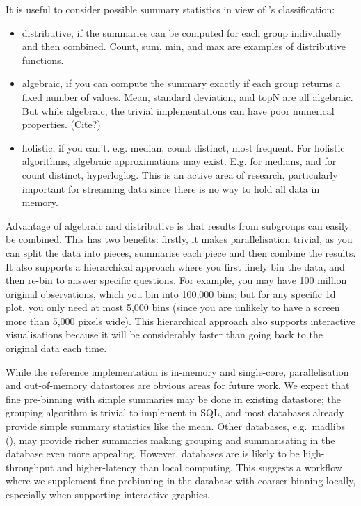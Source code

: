 \documentclass[journal]{vgtc}                %
\begin{document}
It is useful to consider possible summary statistics in view of \citep{gray:1997}'s classification:

\begin{itemize}
  \item distributive, if the summaries can be computed for each group individually and then combined. Count, sum, min, and max are examples of distributive functions.
  
  \item algebraic, if you can compute the summary exactly if each group returns a fixed number of values. Mean, standard deviation, and topN are all algebraic. But while algebraic, the trivial implementations can have poor numerical properties. (Cite?)
  
  \item holistic, if you can't. e.g. median, count distinct, most frequent. For holistic algorithms, algebraic approximations may exist. E.g. for medians, and for count distinct, hyperloglog.  This is an active area of research, particularly important for streaming data since there is no way to hold all data in memory.

\end{itemize}

Advantage of algebraic and distributive is that results from subgroups can easily be combined. This has two benefits: firstly, it makes parallelisation trivial, as you can split the data into pieces, summarise each piece and then combine the results. It also supports a hierarchical approach where you first finely bin the data, and then re-bin to answer specific questions. For example, you may have 100 million original observations, which you bin into 100,000 bins; but for any specific 1d plot, you only need at most 5,000 bins (since you are unlikely to have a screen more than 5,000 pixels wide). This hierarchical approach also supports interactive visualisations because it will be considerably faster than going back to the original data each time.

While the reference implementation is in-memory and single-core, parallelisation and out-of-memory datastores are obvious areas for  future work. We expect that fine pre-binning with simple summaries may be done in existing datastore; the grouping algorithm is trivial to implement in SQL, and most databases already provide simple summary statistics like the mean. Other databases, e.g.\ madlibs (), may provide richer summaries making grouping and summarisating in the database even more appealing. However, databases are is likely to be high-throughput and higher-latency than local computing. This suggests a workflow where we supplement fine prebinning in the database with coarser binning locally, especially when supporting interactive graphics.
\end{document}
